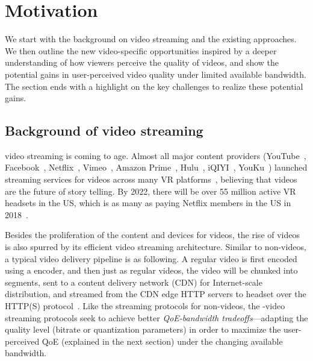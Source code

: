 
\section{Motivation}
\label{sec:motivate}

We start with the background on \vr video streaming and the existing approaches.
We then outline the new \vr video-specific opportunities inspired by a deeper understanding of how viewers perceive the quality of \vr videos, and show the potential gains in user-perceived \vr video quality under limited available bandwidth. 
The section ends with a highlight on the key challenges to realize these potential gains.


\subsection{Background of \vr video streaming}
\label{subsec:background}

\vr video streaming is coming to age. 
Almost all major content providers (YouTube~\cite{??}, Facebook~\cite{??}, Netflix~\cite{??}, Vimeo~\cite{??}, Amazon Prime~\cite{??}, Hulu~\cite{??}, iQIYI~\cite{??}, YouKu~\cite{??}) launched streaming services for \vr videos across many VR platforms~\cite{oculus,samsung,daydreams,etc}, believing that \vr videos are the future of story telling. 
By 2022, there will be over 55 million active VR headsets in the US, which is as many as paying Netflix members in the US in 2018~\cite{https://qz.com/1298512/vr-could-be-as-big-in-the-us-as-netflix-in-five-years-study-shows/}.

Besides the proliferation of the content and devices for \vr videos, the rise of \vr videos is also spurred by its efficient video streaming architecture.
Similar to non-\vr videos, a typical \vr video delivery pipeline is as following. 
A regular video is first encoded using a \vr encoder, and then just as regular videos, the \vr video will be chunked into segments, sent to a content delivery network (CDN) for Internet-scale distribution, and streamed from the CDN edge HTTP servers to \vr headset over the HTTP(S) protocol~\cite{hls,https://www.wowza.com/solutions/streaming-types/virtual-reality-and-360-degree-streaming}.
Like the streaming protocols for non-\vr videos, the \vr-video streaming protocols seek to achieve better {\em QoE-bandwidth tradeoffs}---adapting the quality level (\eg bitrate or quantization parameters) in order to maximize the user-perceived QoE (explained in the next section) under the changing available bandwidth.



